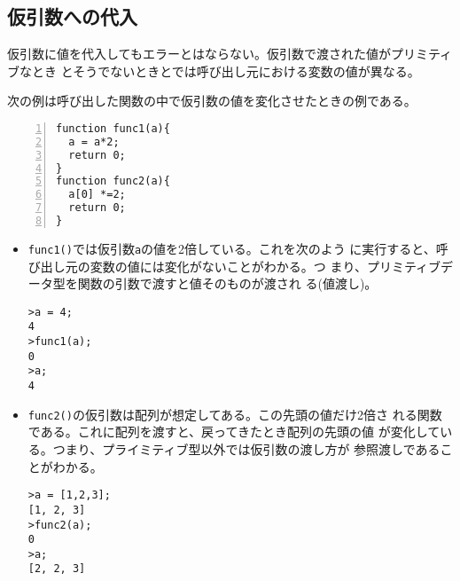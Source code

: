 
\subsection{仮引数への代入}
\renewcommand{\theFancyVerbLine}{\normalsize\arabic{FancyVerbLine}}
仮引数に値を代入してもエラーとはならない。仮引数で渡された値がプリミティブなとき
とそうでないときとでは呼び出し元における変数の値が異なる。
\begin{Exec}\label{Params}\upshape
 次の例は呼び出した関数の中で仮引数の値を変化させたときの例である。
\begin{Verbatim}[numbers=left]
function func1(a){
  a = a*2;
  return 0;
}
function func2(a){
  a[0] *=2;
  return 0;
}
\end{Verbatim}
\end{Exec}
\begin{itemize}
 \item \Verb+func1()+では仮引数\Verb+a+の値を2倍している。これを次のよう
       に実行すると、呼び出し元の変数の値には変化がないことがわかる。つ
       まり、プリミティブデータ型を関数の引数で渡すと値そのものが渡され
       る(値渡し)。
\begin{Verbatim}
>a = 4;
4
>func1(a);
0
>a;
4
\end{Verbatim}
 \item \Verb+func2()+の仮引数は配列が想定してある。この先頭の値だけ2倍さ
       れる関数である。これに配列を渡すと、戻ってきたとき配列の先頭の値
       が変化している。つまり、プライミティブ型以外では仮引数の渡し方が
       参照渡しであることがわかる。
\begin{Verbatim}
>a = [1,2,3];
[1, 2, 3]
>func2(a);
0
>a;
[2, 2, 3]
\end{Verbatim}
\end{itemize}
\iffalse
